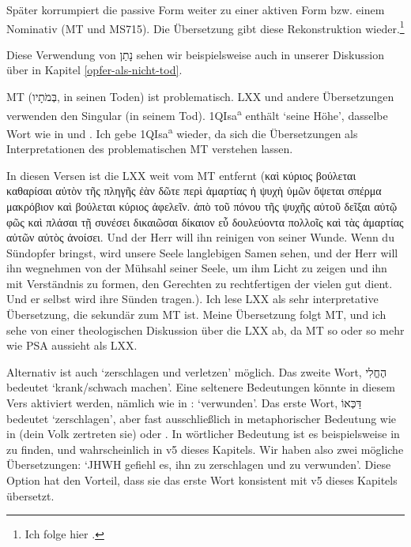 \begin{description}
		Später korrumpiert die passive Form weiter zu einer aktiven Form bzw. einem Nominativ (MT und MS715).
		Die Übersetzung gibt diese Rekonstruktion wieder.\footnote{Ich folge hier \Cite{meade-isa-53-8}.}
	\item[9 man wies zu] Diese Verwendung von נָתַן sehen wir beispielsweise auch in unserer Diskussion über  in Kapitel \ref{opfer-als-nicht-tod}.
	\item[sein Grab] MT (בְּמֹתָיו, in seinen Toden) ist problematisch. LXX und andere Übersetzungen verwenden den Singular (in seinem Tod).
		1QIsa\textsuperscript{a} enthält `seine Höhe', dasselbe Wort wie in  und .
		Ich gebe 1QIsa\textsuperscript{a} wieder, da sich die Übersetzungen als Interpretationen des problematischen MT verstehen lassen.
	\item[10-11] In diesen Versen ist die LXX weit vom MT entfernt (καὶ κύριος βούλεται καθαρίσαι αὐτὸν τῆς πληγῆς ἐὰν δῶτε περὶ ἁμαρτίας ἡ ψυχὴ ὑμῶν ὄψεται σπέρμα μακρόβιον
		καὶ βούλεται κύριος ἀφελεῖν.
		ἀπὸ τοῦ πόνου τῆς ψυχῆς αὐτοῦ δεῖξαι αὐτῷ φῶς καὶ πλάσαι τῇ συνέσει δικαιῶσαι δίκαιον εὖ δουλεύοντα πολλοῖς καὶ τὰς ἁμαρτίας αὐτῶν αὐτὸς ἀνοίσει.
		Und der Herr will ihn reinigen von seiner Wunde.
		Wenn du Sündopfer bringst, wird unsere Seele langlebigen Samen sehen, und der Herr will ihn wegnehmen von der Mühsahl seiner Seele,
		um ihm Licht zu zeigen und ihn mit Verständnis zu formen, den Gerechten zu rechtfertigen der vielen gut dient.
		Und er selbst wird ihre Sünden tragen.).
		Ich lese LXX als sehr interpretative Übersetzung, die sekundär zum MT ist.
		Meine Übersetzung folgt MT, und ich sehe von einer theologischen Diskussion über die LXX ab, da MT so oder so mehr wie PSA aussieht als LXX.
	\item[10 erniedrigen und schwach zu machen] Alternativ ist auch `zerschlagen und verletzen' möglich.
		Das zweite Wort, הֶחֱלִי bedeutet `krank/schwach machen'.
		Eine seltenere Bedeutungen könnte in diesem Vers aktiviert werden, nämlich wie in : `verwunden'.
		Das erste Wort, דַּכְּאוֹ bedeutet `zerschlagen', aber fast ausschließlich in metaphorischer Bedeutung wie in  (dein Volk zertreten sie) oder .
		In wörtlicher Bedeutung ist es beispielsweise in  zu finden, und wahrscheinlich in v5 dieses Kapitels.
		Wir haben also zwei mögliche Übersetzungen: `JHWH gefiehl es, ihn zu zerschlagen und zu verwunden'.
		Diese Option hat den Vorteil, dass sie das erste Wort konsistent mit v5 dieses Kapitels übersetzt.

\end{description}
